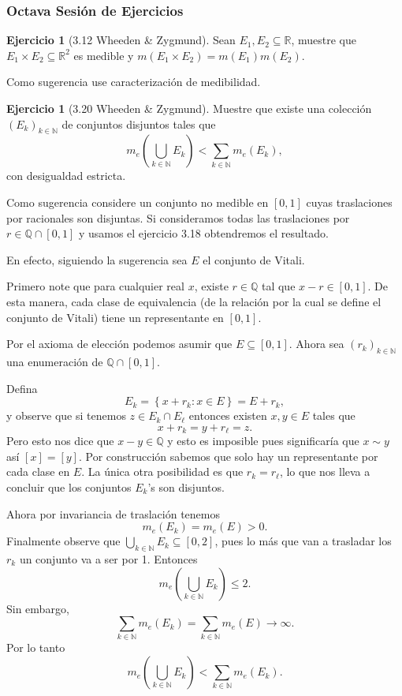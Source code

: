 \documentclass[12pt]{article}
\theoremstyle{plain}
\theoremstyle{definition}
\newtheorem{Ej}[Th]{Ejercicio}
\theoremstyle{remark}
\numberwithin{equation}{section}
\newcommand{\bN}{\mathbb{N}}        %
\newcommand{\bQ}{\mathbb{Q}}        %
\newcommand{\bR}{\mathbb{R}}        %
\renewcommand{\leq}{\leqslant}      %
\renewcommand{\:}{\colon}           %
\newcommand{\conj}[1]{\left\lbrace#1\right\rbrace}
\newcommand{\bonj}[1]{\left\lbrack#1\right\rbrack}
\begin{document}
\begin{multicols}{2}
\subsubsection*{Octava Sesión de Ejercicios}

\begin{Ej}[3.12  Wheeden \& Zygmund]
Sean $E_1,E_2\subseteq\bR$, muestre que $E_1\times E_2\subseteq\bR^2$ es medible y $m(E_1\times E_2)=m(E_1)m(E_2)$. \par
Como sugerencia use caracterización de medibilidad.
\end{Ej}

\begin{Ej}[3.20  Wheeden \& Zygmund]
Muestre que existe una colección $(E_k)_{k\in\bN}$ de conjuntos disjuntos tales que
$$m_e\left(\bigcup_{k\in\bN}E_k\right)<\sum_{k\in\bN}m_e(E_k),$$
con desigualdad estricta.\par
Como sugerencia considere un conjunto no medible en $\bonj{0,1}$ cuyas traslaciones por racionales son disjuntas. Si consideramos todas las traslaciones por $r\in\bQ\cap\bonj{0,1}$ y usamos el ejercicio 3.18 obtendremos el resultado.
\end{Ej}

\begin{ptcbp}
En efecto, siguiendo la sugerencia sea $E$ el conjunto de Vitali. \par
Primero note que para cualquier real $x$, existe $r\in\bQ$ tal que $x-r\in\bonj{0,1}$. De esta manera, cada clase de equivalencia (de la relación por la cual se define el conjunto de Vitali) tiene un representante en $\bonj{0,1}$.\par
Por el axioma de elección podemos asumir que $E\subseteq\bonj{0,1}$. Ahora sea $(r_k)_{k\in\bN}$ una enumeración de $\bQ\cap\bonj{0,1}$.\par
Defina $$E_k=\conj{x+r_k\: x\in E}=E+r_k,$$ y observe que si tenemos $z\in E_k\cap E_\ell$ entonces existen $x,y\in E$ tales que
$$x+r_k=y+r_\ell=z.$$
Pero esto nos dice que $x-y\in\bQ$ y esto es imposible pues significaría que $x\sim y$  así $\bonj{x}=\bonj{y}$. Por construcción sabemos que solo hay un representante por cada clase en $E$. La única otra posibilidad es que $r_k=r_\ell$, lo que nos lleva a concluir que los conjuntos $E_k$'s son disjuntos.\par
Ahora por invariancia de traslación tenemos
$$m_e(E_k)=m_e(E)>0.$$
Finalmente observe que $\bigcup_{k\in\bN}E_k\subseteq \bonj{0,2}$, pues lo más que van a trasladar los $r_k$ un conjunto va a ser por 1. Entonces
$$m_e\left(\bigcup_{k\in\bN}E_k\right)\leq 2.$$
Sin embargo,
$$\sum_{k\in\bN}m_e(E_k)=\sum_{k\in\bN}m_e(E)\to\infty.$$
Por lo tanto
$$m_e\left(\bigcup_{k\in\bN}E_k\right)<\sum_{k\in\bN}m_e(E_k).$$
\end{ptcbp}


\end{multicols}
\end{document}
